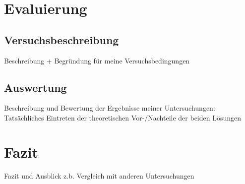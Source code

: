 \chapter{Evaluierung}
\section{Versuchsbeschreibung}
Beschreibung + Begründung für meine Versuchsbedingungen
\section{Auswertung}
Beschreibung und Bewertung der Ergebnisse meiner Untersuchungen: Tatsächliches Eintreten der theoretischen Vor-/Nachteile der beiden Lösungen

\chapter{Fazit}
Fazit und Ausblick
z.b. Vergleich mit anderen Untersuchungen

